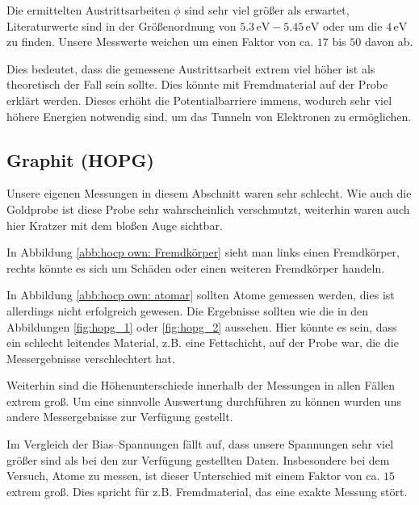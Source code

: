 \documentclass[12pt,a4paper]{scrartcl}
\numberwithin{equation}{section} %
\begin{document}
Die ermittelten Austrittsarbeiten $\phi$ sind sehr viel größer als erwartet, Literaturwerte sind in der Größenordnung von $5.3\mathrm{\,eV} - 5.45\mathrm{\,eV}$ \cite{Sachtler} oder um die $4\mathrm{\,eV}$ \cite{Anleitung} zu finden. Unsere Messwerte weichen um einen Faktor von ca. $17$ bis $50$ davon ab.

Dies bedeutet, dass die gemessene Austrittsarbeit extrem viel höher ist als theoretisch der Fall sein sollte. Dies könnte mit Fremdmaterial auf der Probe erklärt werden. Dieses erhöht die Potentialbarriere immens, wodurch sehr viel höhere Energien notwendig sind, um das Tunneln von Elektronen zu ermöglichen.

\hypertarget{graphit-hopg}{%
\subsection{Graphit (HOPG)}\label{graphit-hopg}}
Unsere eigenen Messungen in diesem Abschnitt waren sehr schlecht. Wie auch die Goldprobe ist diese Probe sehr wahrscheinlich verschmutzt, weiterhin waren auch hier Kratzer mit dem bloßen Auge sichtbar.

In Abbildung \ref{abb:hocp own: Fremdkörper} sieht man links einen Fremdkörper, rechts könnte es sich um Schäden oder einen weiteren Fremdkörper handeln.

In Abbildung \ref{abb:hocp own: atomar} sollten Atome gemessen werden, dies ist allerdings nicht erfolgreich gewesen. Die Ergebnisse sollten wie die in den Abbildungen \ref{fig:hopg_1} oder \ref{fig:hopg_2} aussehen. Hier könnte es sein, dass ein schlecht leitendes Material, z.B. eine Fettschicht, auf der Probe war, die die Messergebnisse verschlechtert hat.

Weiterhin sind die Höhenunterschiede innerhalb der Messungen in allen Fällen extrem groß. Um eine sinnvolle Auswertung durchführen zu können wurden uns andere Messergebnisse zur Verfügung gestellt. \cite{Grover}

Im Vergleich der Bias--Spannungen fällt auf, dass unsere Spannungen sehr viel größer sind als bei den zur Verfügung gestellten Daten. Insbesondere bei dem Versuch, Atome zu messen, ist dieser Unterschied mit einem Faktor von ca. $15$ extrem groß. Dies spricht für z.B. Fremdmaterial, das eine exakte Messung stört.
\end{document}
